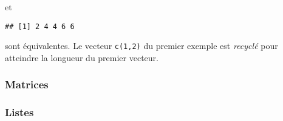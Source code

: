 \noindent et

\begin{knitrout}
\color{fgcolor}\begin{kframe}
\begin{flushleft}
\ttfamily\noindent
{}\hlkeyword{(}\hlkeyword{,}{\ }\hlkeyword{,}{\ }\hlkeyword{,}{\ }\hlkeyword{,}{\ }\hlkeyword{)}{\ }\hlkeyword{+}{\ }\hlkeyword{(}\hlkeyword{,}{\ }\hlkeyword{,}{\ }\hlkeyword{,}{\ }\hlkeyword{,}{\ }\hlkeyword{)}\mbox{}
\normalfont
\end{flushleft}
\begin{verbatim}
## [1] 2 4 4 6 6
\end{verbatim}
\end{kframe}
\end{knitrout}


\noindent sont équivalentes.
Le vecteur \texttt{c(1,2)} du premier exemple est \emph{recyclé} pour atteindre la longueur du premier vecteur.

\subsubsection{Matrices}

\subsubsection{Listes}
